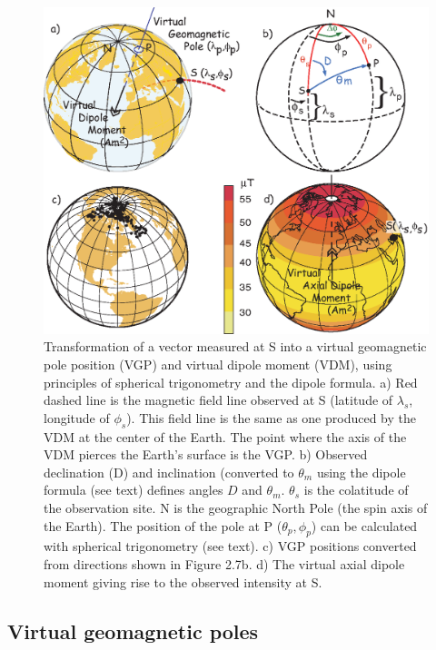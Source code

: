 \begin{figure}[!htb]
\centering  \includegraphics[width=13 cm]{EPSfiles/mkvgp.eps}
\caption {Transformation of a vector measured at S into a virtual
geomagnetic pole position (VGP) and virtual dipole moment (VDM),
using principles of spherical trigonometry and the dipole formula.  a) Red dashed line is the magnetic field line  observed at S (latitude of $\lambda_s$, longitude of $\phi_s$).  This field line is the  same as one produced by the VDM at the center of the Earth.  The point where the axis of the  VDM pierces the Earth's surface is the VGP.    b)  Observed declination (D) and inclination (converted to $\theta_m$ using the dipole formula (see text) defines angles $D$ and $\theta_m$.  $\theta_s$ is the colatitude of the observation site. N is the geographic North Pole (the spin axis of
the Earth). The position of the pole at P ($\theta_p,\phi_p$)  can be calculated with spherical trigonometry (see text).    c) VGP positions converted from directions shown in Figure 2.7b. d) The virtual axial dipole moment giving rise to the observed intensity at S.}
\label{fig:mkvgp}
\end{figure}

\subsection{Virtual geomagnetic poles}
\label{sect:vgp}

